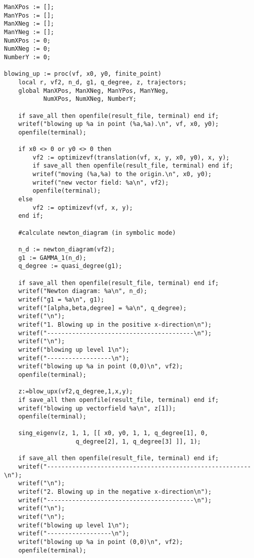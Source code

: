 \documentclass[a4paper,10pt]{article}
\begin{document}
\begin{lstlisting}[name=blowup]
ManXPos := [];
ManYPos := [];
ManXNeg := [];
ManYNeg := [];
NumXPos := 0;
NumXNeg := 0;
NumberY := 0;

blowing_up := proc(vf, x0, y0, finite_point)
    local r, vf2, n_d, g1, q_degree, z, trajectors;
    global ManXPos, ManXNeg, ManYPos, ManYNeg,
           NumXPos, NumXNeg, NumberY;

    if save_all then openfile(result_file, terminal) end if;
    writef("blowing up %a in point (%a,%a).\n", vf, x0, y0);
    openfile(terminal);

    if x0 <> 0 or y0 <> 0 then
        vf2 := optimizevf(translation(vf, x, y, x0, y0), x, y);
        if save_all then openfile(result_file, terminal) end if;
        writef("moving (%a,%a) to the origin.\n", x0, y0);
        writef("new vector field: %a\n", vf2);
        openfile(terminal);
    else
        vf2 := optimizevf(vf, x, y);
    end if;

    #calculate newton_diagram (in symbolic mode)

    n_d := newton_diagram(vf2);
    g1 := GAMMA_1(n_d);
    q_degree := quasi_degree(g1);

    if save_all then openfile(result_file, terminal) end if;
    writef("Newton diagram: %a\n", n_d);
    writef("g1 = %a\n", g1);
    writef("[alpha,beta,degree] = %a\n", q_degree);
    writef("\n");
    writef("1. Blowing up in the positive x-direction\n");
    writef("-----------------------------------------\n");
    writef("\n");
    writef("blowing up level 1\n");
    writef("------------------\n");
    writef("blowing up %a in point (0,0)\n", vf2);
    openfile(terminal);

    z:=blow_upx(vf2,q_degree,1,x,y);
    if save_all then openfile(result_file, terminal) end if;
    writef("blowing up vectorfield %a\n", z[1]);
    openfile(terminal);

    sing_eigenv(z, 1, 1, [[ x0, y0, 1, 1, q_degree[1], 0,
                    q_degree[2], 1, q_degree[3] ]], 1);

    if save_all then openfile(result_file, terminal) end if;
    writef("---------------------------------------------------------\n");
    writef("\n");
    writef("2. Blowing up in the negative x-direction\n");
    writef("-----------------------------------------\n");
    writef("\n");
    writef("\n");
    writef("blowing up level 1\n");
    writef("------------------\n");
    writef("blowing up %a in point (0,0)\n", vf2);
    openfile(terminal);


\end{lstlisting}
\end{document}
